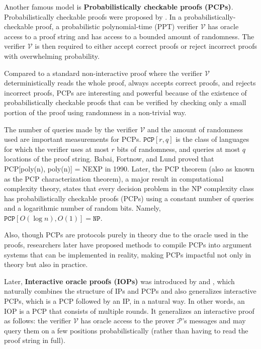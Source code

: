 Another famous model is \textbf{Probabilistically checkable proofs (PCPs)}. Probabilistically checkable proofs were proposed by \cite{DBLP:journals/tcs/FortnowRS94} \cite{DBLP:conf/stoc/BabaiFLS91}. In a probabilistically-checkable proof, a probabilistic polynomial-time (PPT) verifier $\mathcal{V}$ has oracle access to a proof string and has access to a bounded amount of randomness. The verifier $\mathcal{V}$ is then required to either accept correct proofs or reject incorrect proofs with overwhelming probability. 

Compared to a standard non-interactive proof where the verifier $\mathcal{V}$ deterministically reads the whole proof, always accepts correct proofs, and rejects incorrect proofs, 
PCPs are interesting and powerful because of the existence of probabilistically checkable proofs that can be verified by checking only a small portion of the proof using randomness in a non-trivial way.

The number of queries made by the verifier $\mathcal{V}$ and the amount of randomness used are important measurements for PCPs. $\texttt{PCP}[r, q]$ is the class of languages for which the verifier uses at most $r$ bits of randomness, and queries at most $q$ locations of the proof string.
Babai, Fortnow, and Lund \cite{DBLP:conf/focs/BabaiFL90} proved that PCP[poly(n), poly(n)] = NEXP in 1990. 
Later, the PCP theorem (also as known as the PCP characterization theorem), 
a major result in computational complexity theory, 
states that every decision problem in the NP complexity class has probabilistically checkable proofs (PCPs) using a constant number of queries and a logarithmic number of random bits.
Namely, $\texttt{PCP}[O(\log n), O(1)] = \texttt{NP}$.

Also, though PCPs are protocols purely in theory due to the oracle used in the proofs, researchers later have proposed methods \cite{DBLP:conf/stoc/Kilian92} to compile PCPs into argument systems that can be implemented in reality, making PCPs impactful not only in theory but also in practice. 

Later, \textbf{Interactive oracle proofs (IOPs)} was introduced by \cite{DBLP:conf/tcc/Ben-SassonCS16} and \cite{DBLP:journals/jacm/KalaiRR22}, which naturally combines the structure of IPs and PCPs and also generalizes interactive PCPs, which is a PCP followed by an IP, in a natural way.
In other words, an IOP is a PCP that consists of multiple rounds. It generalizes an interactive proof as follows:
the verifier $\mathcal{V}$ has oracle access to the prover $\mathcal{P}$’s messages and may query them on a few positions probabilistically (rather than having to read the proof string in full). 

